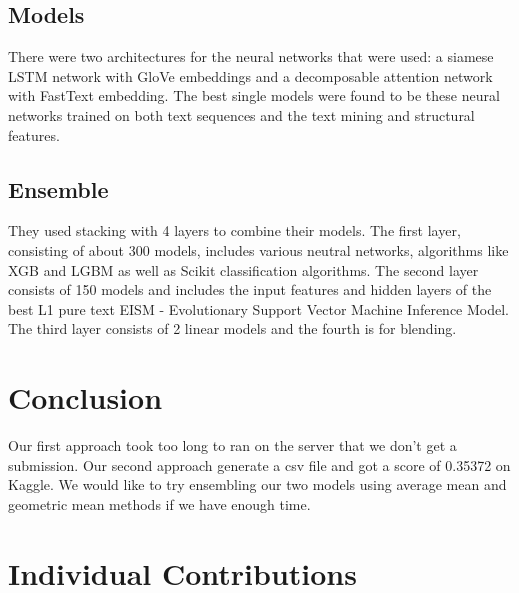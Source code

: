 \documentclass{article}
\begin{document}
\subsection{Models}

There were two architectures for the neural networks that were used: a siamese
LSTM network with GloVe embeddings and a decomposable attention network with
FastText embedding. The best single models were found to be these neural
networks trained on both text sequences and the text mining and structural
features.

\subsection{Ensemble}

They used stacking with 4 layers to combine their models. The first layer,
consisting of about 300 models, includes various neutral networks, algorithms
like XGB and LGBM as well as Scikit classification algorithms. The second layer
consists of 150 models and includes the input features and hidden layers of the
best L1 pure text EISM - Evolutionary Support Vector Machine Inference Model.
The third layer consists of 2 linear models and the fourth is for blending.

\section{Conclusion}

Our first approach took too long to ran on the server that we don't get a submission.
Our second approach generate a csv file and got a score of 0.35372 on Kaggle. 
We would like to try ensembling our two models using average mean and geometric mean methods if 
we have enough time. 
\appendix
\section*{Individual Contributions}
\end{document}
